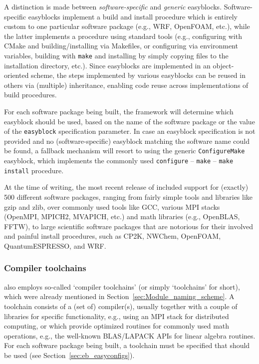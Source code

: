 A distinction is made between \emph{software-specific} and \emph{generic} easyblocks.
Software-specific easyblocks implement a build and install procedure which is entirely
custom to one particular software package (e.g., WRF, OpenFOAM, etc.), while the
latter implements a procedure using standard tools (e.g., configuring with CMake and
building/installing via Makefiles, or configuring via environment variables, building
with \texttt{make} and installing by simply copying files to the installation
directory, etc.). Since easyblocks are implemented in an object-oriented scheme,
the steps implemented by various easyblocks can be reused in others via (multiple)
inheritance, enabling code reuse across implementations of build procedures.

For each software package being built, the \easybuild{} framework will determine
which easyblock should be used, based on the name of the software package or the
value of the \texttt{easyblock} specification parameter. In case an easyblock
specification is not provided and no (software-specific) easyblock matching the
software name could be found, a fallback mechanism will resort to using the generic
\texttt{ConfigureMake} easyblock, which implements the commonly used
\texttt{configure} -- \texttt{make} -- \texttt{make install} procedure.

At the time of writing, the most recent release of \easybuild{} included support for
(exactly) 500 different software packages, ranging from fairly simple tools and
libraries like gzip and zlib, over commonly used tools like GCC, various MPI
stacks (OpenMPI, MPICH2, MVAPICH, etc.) and math libraries (e.g., OpenBLAS,
FFTW), to large scientific software packages that are notorious for their involved
and painful install procedures, such as CP2K, NWChem, OpenFOAM, QuantumESPRESSO, and
WRF.

\subsubsection{Compiler toolchains}

\easybuild{} also employs so-called `compiler toolchains' (or simply `toolchains'
for short), which were already mentioned in Section~\ref{sec:Module_naming_scheme}.
A toolchain consists of a (set of) compiler(s), usually together with a couple of
libraries for specific functionality, e.g., using an MPI stack for distributed
computing, or which provide optimized routines for commonly used math operations,
e.g., the well-known BLAS/LAPACK APIs for linear algebra routines. For each software
package being built, a toolchain must be specified that should be used
(see Section~\ref{sec:eb_easyconfigs}).

